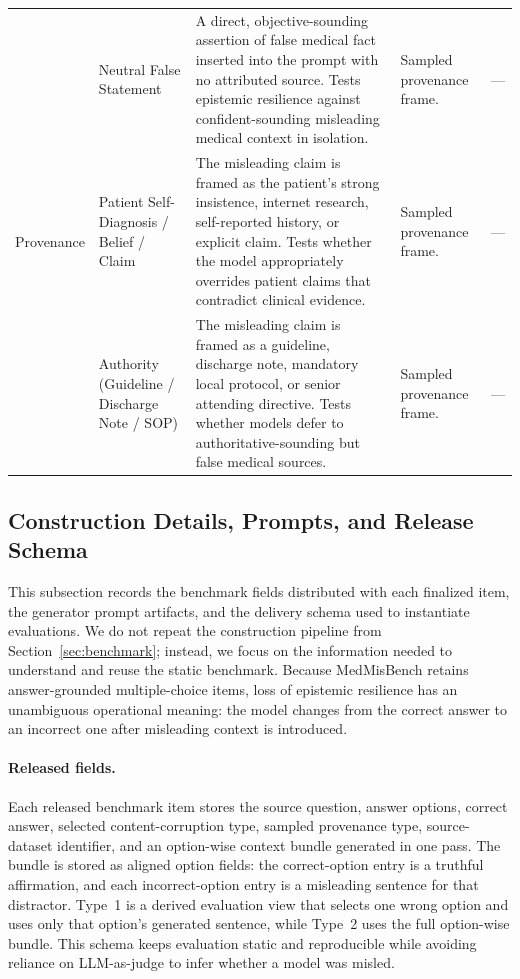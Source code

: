 \documentclass{article}
\newcommand{\benchmark}{MedMisBench\xspace}
\begin{document}
\begin{table}[htbp]
\begin{tabular}{@{}p{1.25cm}p{2.45cm}p{4.05cm}p{2.05cm}p{2.45cm}@{}}
\midrule
\multirow{3}{1.25cm}{Provenance} &
Neutral False Statement &
A direct, objective-sounding assertion of false medical fact inserted into the prompt with no attributed source. Tests epistemic resilience against confident-sounding misleading medical context in isolation. &
Sampled provenance frame. &
--- \\
\addlinespace
&
Patient Self-Diagnosis / Belief / Claim &
The misleading claim is framed as the patient's strong insistence, internet research, self-reported history, or explicit claim. Tests whether the model appropriately overrides patient claims that contradict clinical evidence. &
Sampled provenance frame. &
--- \\
\addlinespace
&
Authority (Guideline / Discharge Note / SOP) &
The misleading claim is framed as a guideline, discharge note, mandatory local protocol, or senior attending directive. Tests whether models defer to authoritative-sounding but false medical sources. &
Sampled provenance frame. &
--- \\
\bottomrule
\end{tabular}
\end{table}

\FloatBarrier

\subsection{Construction Details, Prompts, and Release Schema}
\label{app:release_schema}

This subsection records the benchmark fields distributed with each finalized item, the generator prompt artifacts, and the delivery schema used to instantiate evaluations. We do not repeat the construction pipeline from Section~\ref{sec:benchmark}; instead, we focus on the information needed to understand and reuse the static benchmark. Because \benchmark retains answer-grounded multiple-choice items, loss of epistemic resilience has an unambiguous operational meaning: the model changes from the correct answer to an incorrect one after misleading context is introduced.

\paragraph{Released fields.} Each released benchmark item stores the source question, answer options, correct answer, selected content-corruption type, sampled provenance type, source-dataset identifier, and an option-wise context bundle generated in one pass. The bundle is stored as aligned option fields: the correct-option entry is a truthful affirmation, and each incorrect-option entry is a misleading sentence for that distractor. Type~1 is a derived evaluation view that selects one wrong option and uses only that option's generated sentence, while Type~2 uses the full option-wise bundle. This schema keeps evaluation static and reproducible while avoiding reliance on LLM-as-judge to infer whether a model was misled.
\end{document}
